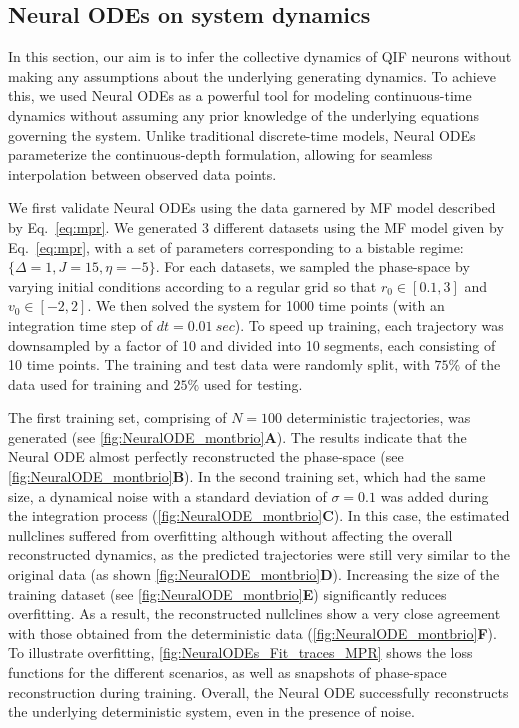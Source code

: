 \documentclass[12pt]{article}
\begin{document}
\subsection{Neural ODEs on system dynamics}

In this section, our aim is to infer the collective dynamics of QIF neurons without making any assumptions about the underlying generating dynamics. To achieve this, we used Neural ODEs as a powerful tool for modeling continuous-time dynamics without assuming any prior knowledge of the underlying equations governing the system. Unlike traditional discrete-time models, Neural ODEs parameterize the continuous-depth formulation, allowing for seamless interpolation between observed data points.

We first validate Neural ODEs using the data garnered by MF model described by Eq.~\eqref{eq:mpr}.  We generated 3 different datasets using the MF model given by Eq.~\eqref{eq:mpr}, with a set of parameters corresponding to a bistable regime: $\{\Delta=1,J=15,\eta=-5\}$. For each datasets, we sampled the phase-space by varying initial conditions according to a regular grid so that $r_0\in[0.1, 3]$ and $v_0\in[-2,2]$. We then solved the system for 1000 time points (with an integration time step of $dt=0.01~sec$). To speed up training, each trajectory was downsampled by a factor of 10 and divided into 10 segments, each consisting of 10 time points. The training and test data were randomly split, with $75\%$ of the data used for training and $25\%$ used for testing. 

The first training set, comprising of $N=100$ deterministic trajectories, was generated (see \autoref{fig:NeuralODE_montbrio}\textbf{A}). The results indicate that the Neural ODE almost perfectly reconstructed the phase-space (see \autoref{fig:NeuralODE_montbrio}\textbf{B}). In the second training set, which had the same size, a dynamical noise with a standard deviation of $\sigma=0.1$ was added during the integration process (\autoref{fig:NeuralODE_montbrio}\textbf{C}). In this case, the estimated nullclines suffered from overfitting although without affecting the overall reconstructed dynamics, as the predicted trajectories were still very similar to the original data  (as shown \autoref{fig:NeuralODE_montbrio}\textbf{D}). Increasing the size of the training dataset (see \autoref{fig:NeuralODE_montbrio}\textbf{E}) significantly reduces overfitting.  As a result, the reconstructed nullclines show a very close agreement with those obtained from the deterministic data (\autoref{fig:NeuralODE_montbrio}\textbf{F}).
To illustrate overfitting, \autoref{fig:NeuralODEs_Fit_traces_MPR} shows the loss functions for the different scenarios, as well as snapshots of phase-space reconstruction during training. Overall, the Neural ODE successfully reconstructs the underlying deterministic system, even in the presence of noise.
\end{document}
